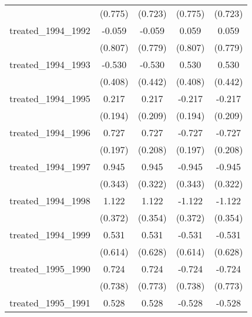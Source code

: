 {\begin{tabular}{l*{4}{c}}
            &     (0.775)         &     (0.723)         &     (0.775)         &     (0.723)         \\
[1em]
treated\_1994\_1992&      -0.059         &      -0.059         &       0.059         &       0.059         \\
            &     (0.807)         &     (0.779)         &     (0.807)         &     (0.779)         \\
[1em]
treated\_1994\_1993&      -0.530         &      -0.530         &       0.530         &       0.530         \\
            &     (0.408)         &     (0.442)         &     (0.408)         &     (0.442)         \\
[1em]
treated\_1994\_1995&       0.217         &       0.217         &      -0.217         &      -0.217         \\
            &     (0.194)         &     (0.209)         &     (0.194)         &     (0.209)         \\
[1em]
treated\_1994\_1996&       0.727\sym{***}&       0.727\sym{***}&      -0.727\sym{***}&      -0.727\sym{***}\\
            &     (0.197)         &     (0.208)         &     (0.197)         &     (0.208)         \\
[1em]
treated\_1994\_1997&       0.945\sym{**} &       0.945\sym{**} &      -0.945\sym{**} &      -0.945\sym{**} \\
            &     (0.343)         &     (0.322)         &     (0.343)         &     (0.322)         \\
[1em]
treated\_1994\_1998&       1.122\sym{**} &       1.122\sym{**} &      -1.122\sym{**} &      -1.122\sym{**} \\
            &     (0.372)         &     (0.354)         &     (0.372)         &     (0.354)         \\
[1em]
treated\_1994\_1999&       0.531         &       0.531         &      -0.531         &      -0.531         \\
            &     (0.614)         &     (0.628)         &     (0.614)         &     (0.628)         \\
[1em]
treated\_1995\_1990&       0.724         &       0.724         &      -0.724         &      -0.724         \\
            &     (0.738)         &     (0.773)         &     (0.738)         &     (0.773)         \\
[1em]
treated\_1995\_1991&       0.528         &       0.528         &      -0.528         &      -0.528         \\

\end{tabular}}

